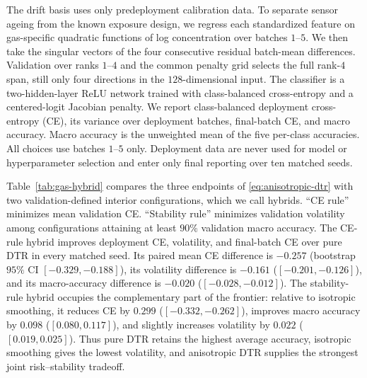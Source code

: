 \documentclass[conference]{IEEEtran}
\begin{document}
The drift basis uses only predeployment calibration data. To separate sensor ageing from the known exposure design, we regress each standardized feature on gas-specific quadratic functions of log concentration over batches $1$--$5$. We then take the singular vectors of the four consecutive residual batch-mean differences. Validation over ranks $1$--$4$ and the common penalty grid selects the full rank-$4$ span, still only four directions in the $128$-dimensional input. The classifier is a two-hidden-layer ReLU network trained with class-balanced cross-entropy and a centered-logit Jacobian penalty. We report class-balanced deployment cross-entropy (CE), its variance over deployment batches, final-batch CE, and macro accuracy. Macro accuracy is the unweighted mean of the five per-class accuracies. All choices use batches $1$--$5$ only. Deployment data are never used for model or hyperparameter selection and enter only final reporting over ten matched seeds.

Table~\ref{tab:gas-hybrid} compares the three endpoints of \eqref{eq:anisotropic-dtr} with two validation-defined interior configurations, which we call hybrids. ``CE rule'' minimizes mean validation CE. ``Stability rule'' minimizes validation volatility among configurations attaining at least $90\%$ validation macro accuracy. The CE-rule hybrid improves deployment CE, volatility, and final-batch CE over pure DTR in every matched seed. Its paired mean CE difference is $-0.257$ (bootstrap $95\%$ CI $[-0.329,-0.188]$), its volatility difference is $-0.161$ ($[-0.201,-0.126]$), and its macro-accuracy difference is $-0.020$ ($[-0.028,-0.012]$). The stability-rule hybrid occupies the complementary part of the frontier: relative to isotropic smoothing, it reduces CE by $0.299$ ($[-0.332,-0.262]$), improves macro accuracy by $0.098$ ($[0.080,0.117]$), and slightly increases volatility by $0.022$ ($[0.019,0.025]$). Thus pure DTR retains the highest average accuracy, isotropic smoothing gives the lowest volatility, and anisotropic DTR supplies the strongest joint risk--stability tradeoff.
\end{document}
